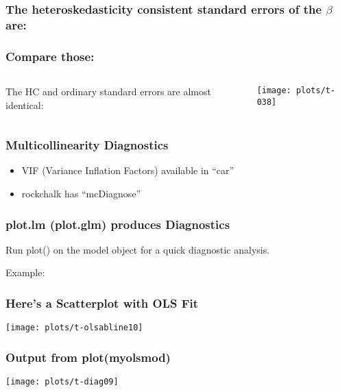 \documentclass[10pt,english]{beamer}
\begin{document}
\begin{frame}[containsverbatim]
  \frametitle{The heteroskedasticity consistent standard errors of the $\hat{\beta}$  are:}


\end{frame}



\begin{frame}
  \frametitle{Compare those:}

\begin{columns}
  \column{3cm}

The HC and ordinary standard errors are almost identical:
  \column{8cm}

\texttt{[image: plots/t-038]}
\end{columns}

\end{frame}

\begin{frame}
  \frametitle{Multicollinearity Diagnostics}

  \begin{itemize}
    \item VIF (Variance Inflation Factors) available in ``car''
    \item rockchalk has ``mcDiagnose''

\end{itemize}
\end{frame}


\begin{frame}[containsverbatim]
\frametitle{plot.lm (plot.glm) produces Diagnostics}

  Run plot() on the model object for a quick diagnostic analysis.

  Example:





\end{frame}

\begin{frame}
  \frametitle{Here's a Scatterplot with OLS Fit}

\texttt{[image: plots/t-olsabline10]}
\end{frame}


\begin{frame}
  \frametitle{Output from plot(myolsmod)}

\texttt{[image: plots/t-diag09]}

\end{frame}
\end{document}
